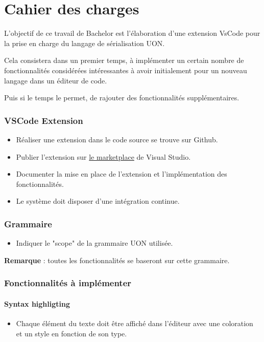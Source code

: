 \documentclass[
    iict, %
    il, %
]{heig-tb}
\begin{document}
\let\cleardoublepage\clearpage

\chapter{Cahier des charges}

L'objectif de ce travail de Bachelor est l'élaboration d'une extension VsCode pour la prise en charge du langage de sérialisation UON.

Cela consistera dans un premier temps, à implémenter un certain nombre de fonctionnalités considérées intéressantes à avoir initialement pour un nouveau langage dans un éditeur de code.

Puis si le temps le permet, de rajouter des fonctionnalités supplémentaires.

\subsection*{VSCode Extension}
\begin{itemize}
    \item Réaliser une extension dans le code source se trouve sur Github.
    \item Publier l’extension sur \href{https://marketplace.visualstudio.com/}{le marketplace} de Visual Studio.
    \item Documenter la mise en place de l’extension et l’implémentation des fonctionnalités.
    \item Le système doit disposer d’une intégration continue.
\end{itemize}

\subsection*{Grammaire}
\begin{itemize}
    \item Indiquer le "scope" de la grammaire UON utilisée.
\end{itemize}
\textbf{Remarque} : toutes les fonctionnalités se baseront sur cette grammaire.

\subsection*{Fonctionnalités à implémenter}
\subsubsection*{Syntax highligting}
\begin{itemize}
    \item Chaque élément du texte doit être affiché dans l’éditeur avec une coloration et un style en fonction de son type.
\end{itemize}
\end{document}
